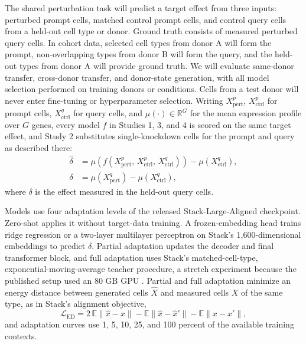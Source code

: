\documentclass[times, twoside, watermark]{zHenriquesLab-StyleBioRxiv}
\begin{document}
The shared perturbation task will predict a target effect from three inputs: perturbed prompt cells, matched control prompt cells, and control query cells from a held-out cell type or donor. Ground truth consists of measured perturbed query cells. In cohort data, selected cell types from donor A will form the prompt, non-overlapping types from donor B will form the query, and the held-out types from donor A will provide ground truth. We will evaluate same-donor transfer, cross-donor transfer, and donor-state generation, with all model selection performed on training donors or conditions. Cells from a test donor will never enter fine-tuning or hyperparameter selection. Writing $X^{p}_{\mathrm{pert}}$, $X^{p}_{\mathrm{ctrl}}$ for prompt cells, $X^{q}_{\mathrm{ctrl}}$ for query cells, and $\mu(\cdot)\in\mathbb{R}^{G}$ for the mean expression profile over $G$ genes, every model $f$ in Studies 1, 3, and 4 is scored on the same target effect, and Study 2 substitutes single-knockdown cells for the prompt and query as described there:
\begin{equation}
\begin{aligned}
\hat{\delta} &= \mu\!\left(f\!\left(X^{p}_{\mathrm{pert}},\, X^{p}_{\mathrm{ctrl}},\, X^{q}_{\mathrm{ctrl}}\right)\right) - \mu\!\left(X^{q}_{\mathrm{ctrl}}\right),\\
\delta &= \mu\!\left(X^{q}_{\mathrm{pert}}\right) - \mu\!\left(X^{q}_{\mathrm{ctrl}}\right),
\end{aligned}
\label{eq:effect}
\end{equation}
where $\delta$ is the effect measured in the held-out query cells.

Models use four adaptation levels of the released Stack-Large-Aligned checkpoint. Zero-shot applies it without target-data training. A frozen-embedding head trains ridge regression or a two-layer multilayer perceptron on Stack's 1,600-dimensional embeddings to predict $\delta$. Partial adaptation updates the decoder and final transformer block, and full adaptation uses Stack's matched-cell-type, exponential-moving-average teacher procedure, a stretch experiment because the published setup used an 80 GB GPU \cite{dong2026stack}. Partial and full adaptation minimize an energy distance between generated cells $\hat{X}$ and measured cells $X$ of the same type, as in Stack's alignment objective,
\begin{equation}
\mathcal{L}_{\mathrm{ED}} = 2\,\mathbb{E}\|\hat{x}-x\| - \mathbb{E}\|\hat{x}-\hat{x}'\| - \mathbb{E}\|x-x'\|,
\end{equation}
and adaptation curves use 1, 5, 10, 25, and 100 percent of the available training contexts.
\end{document}
